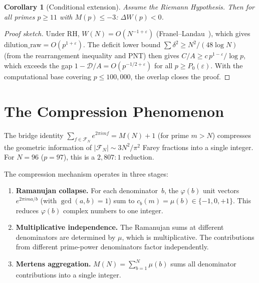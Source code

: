 \documentclass[11pt]{article}
\newtheorem{corollary}[theorem]{Corollary}
\theoremstyle{definition}
\newcommand{\F}{\mathcal{F}}
\begin{document}
\begin{corollary}[Conditional extension]\label{cor:rh-sign}
Assume the Riemann Hypothesis.  Then for all primes $p \ge 11$
with $M(p) \le -3$: $\Delta W(p) < 0$.
\end{corollary}

\begin{proof}[Proof sketch]
Under RH, $W(N) = O(N^{-1+\varepsilon})$
(Franel--Landau~\cite{Franel1924, Landau1924}), which gives
$\text{dilution\_raw} = O(p^{1+\varepsilon})$.
The deficit lower bound $\sum \delta^2 \ge N^2/(48\log N)$
(from the rearrangement inequality and PNT) then gives
$C/A \ge c\,p^{1-\varepsilon}/\log p$, which exceeds the gap
$1 - \mathcal{D}/A = O(p^{-1/2+\varepsilon})$ for all
$p \ge P_0(\varepsilon)$.  With the computational base
covering $p \le 100{,}000$, the overlap closes the proof.
\end{proof}

\section{The Compression Phenomenon}\label{sec:compression}

The bridge identity $\sum_{f \in \F_N} e^{2\pi imf} = M(N) + 1$
(for prime $m > N$) compresses the geometric information of
$|\F_N| \sim 3N^2/\pi^2$ Farey fractions into a single integer.
For $N = 96$ ($p = 97$), this is a $2{,}807 : 1$ reduction.

The compression mechanism operates in three stages:
\begin{enumerate}
\item \textbf{Ramanujan collapse.}  For each denominator~$b$,
the $\varphi(b)$ unit vectors $e^{2\pi i m a/b}$ (with
$\gcd(a,b) = 1$) sum to $c_b(m) = \mu(b) \in \{-1, 0, +1\}$.
This reduces $\varphi(b)$ complex numbers to one integer.

\item \textbf{Multiplicative independence.}  The Ramanujan sums
at different denominators are determined by $\mu$, which is
multiplicative.  The contributions from different prime-power
denominators factor independently.

\item \textbf{Mertens aggregation.}
$M(N) = \sum_{b=1}^{N} \mu(b)$ sums all denominator
contributions into a single integer.
\end{enumerate}
\end{document}
